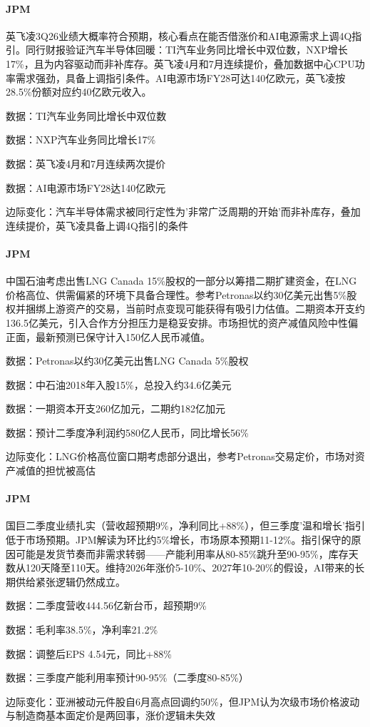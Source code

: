 \documentclass[11pt]{ctexart}
\begin{document}
\paragraph{JPM} 英飞凌3Q26业绩大概率符合预期，核心看点在能否借涨价和AI电源需求上调4Q指引。同行财报验证汽车半导体回暖：TI汽车业务同比增长中双位数，NXP增长17\%，且为内容驱动而非补库存。英飞凌4月和7月连续提价，叠加数据中心CPU功率需求强劲，具备上调指引条件。AI电源市场FY28可达140亿欧元，英飞凌按28.5\%份额对应约40亿欧元收入。
{\small\color{refgray}数据：TI汽车业务同比增长中双位数\par}
{\small\color{refgray}数据：NXP汽车业务同比增长17\%\par}
{\small\color{refgray}数据：英飞凌4月和7月连续两次提价\par}
{\small\color{refgray}数据：AI电源市场FY28达140亿欧元\par}
{\small\color{refgray}边际变化：汽车半导体需求被同行定性为'非常广泛周期的开始'而非补库存，叠加连续提价，英飞凌具备上调4Q指引的条件\par}
\paragraph{JPM} 中国石油考虑出售LNG Canada 15\%股权的一部分以筹措二期扩建资金，在LNG价格高位、供需偏紧的环境下具备合理性。参考Petronas以约30亿美元出售5\%股权并捆绑上游资产的交易，当前时点变现可能获得有吸引力估值。二期资本开支约136.5亿美元，引入合作方分担压力是稳妥安排。市场担忧的资产减值风险中性偏正面，最新预测已保守计入150亿人民币减值。
{\small\color{refgray}数据：Petronas以约30亿美元出售LNG Canada 5\%股权\par}
{\small\color{refgray}数据：中石油2018年入股15\%，总投入约34.6亿美元\par}
{\small\color{refgray}数据：一期资本开支260亿加元，二期约182亿加元\par}
{\small\color{refgray}数据：预计二季度净利润约580亿人民币，同比增长56\%\par}
{\small\color{refgray}边际变化：LNG价格高位窗口期考虑部分退出，参考Petronas交易定价，市场对资产减值的担忧被高估\par}
\paragraph{JPM} 国巨二季度业绩扎实（营收超预期9\%，净利同比+88\%），但三季度'温和增长'指引低于市场预期。JPM解读为环比约5\%增长，市场原本预期11-12\%。指引保守的原因可能是发货节奏而非需求转弱——产能利用率从80-85\%跳升至90-95\%，库存天数从120天降至110天。维持2026年涨价5-10\%、2027年10-20\%的假设，AI带来的长期供给紧张逻辑仍然成立。
{\small\color{refgray}数据：二季度营收444.56亿新台币，超预期9\%\par}
{\small\color{refgray}数据：毛利率38.5\%，净利率21.2\%\par}
{\small\color{refgray}数据：调整后EPS 4.54元，同比+88\%\par}
{\small\color{refgray}数据：三季度产能利用率预计90-95\%（二季度80-85\%）\par}
{\small\color{refgray}边际变化：亚洲被动元件股自6月高点回调约50\%，但JPM认为次级市场价格波动与制造商基本面定价是两回事，涨价逻辑未失效\par}
\end{document}
